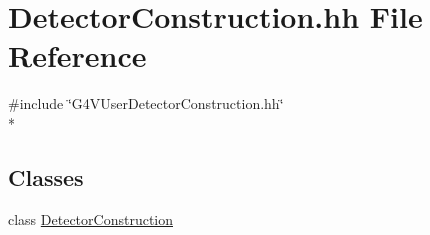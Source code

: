\hypertarget{_detector_construction_8hh}{\section{Detector\-Construction.\-hh File Reference}
\label{_detector_construction_8hh}
}
{\ttfamily \#include \char`\"{}G4\-V\-User\-Detector\-Construction.\-hh\char`\"{}}\\*
\subsection*{Classes}
\begin{DoxyCompactItemize}
\item 
class \hyperlink{class_detector_construction}{Detector\-Construction}
\end{DoxyCompactItemize}

